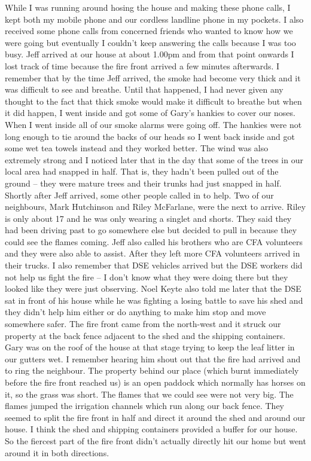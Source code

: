 \documentclass[a4paper]{article}
\begin{document}
    While I was running around hosing the house and making these phone calls, I kept both my mobile phone and our cordless landline phone in my pockets. I also received some phone calls from concerned friends who wanted to know how we were going but eventually I couldn't keep answering the calls because I was too busy.
    Jeff arrived at our house at about 1.00pm and from that point onwards I lost track of time because the fire front arrived a few minutes afterwards. I remember that by the time Jeff arrived, the smoke had become very thick and it was difficult to see and breathe. Until that happened, I had never given any thought to the fact that thick smoke would make it difficult to breathe but when it did happen, I went inside and got some of Gary's hankies to cover our noses. When I went inside all of our smoke alarms were going off. The hankies were not long enough to tie around the backs of our heads so I went back inside and got some wet tea towels instead and they worked better. The wind was also extremely strong and I noticed later that in the day that some of the trees in our local area had snapped in half. That is, they hadn't been pulled out of the ground – they were mature trees and their trunks had just snapped in half.
    Shortly after Jeff arrived, some other people called in to help. Two of our neighbours, Mark Hutchinson and Riley McFarlane, were the next to arrive. Riley is only about 17 and he was only wearing a singlet and shorts. They said they had been driving past to go somewhere else but decided to pull in because they could see the flames coming. Jeff also called his brothers who are CFA volunteers and they were also able to assist. After they left more CFA volunteers arrived in their trucks. I also remember that DSE vehicles arrived but the DSE workers did not help us fight the fire – I don't know what they were doing there but they looked like they were just observing. Noel Keyte also told me later that the DSE sat in front of his house while he was fighting a losing battle to save his shed and they didn't help him either or do anything to make him stop and move somewhere safer.
    The fire front came from the north-west and it struck our property at the back fence adjacent to the shed and the shipping containers. Gary was on the roof of the house at that stage trying to keep the leaf litter in our gutters wet. I remember hearing him shout out that the fire had arrived and to ring the neighbour. The property behind our place (which burnt immediately before the fire front reached us) is an open paddock which normally has horses on it, so the grass was short. The flames that we could see were not very big. The flames jumped the irrigation channels which run along our back fence. They seemed to split the fire front in half and direct it around the shed and around our house. I think the shed and shipping containers provided a buffer for our house. So the fiercest part of the fire front didn't actually directly hit our home but went around it in both directions.
\end{document}
